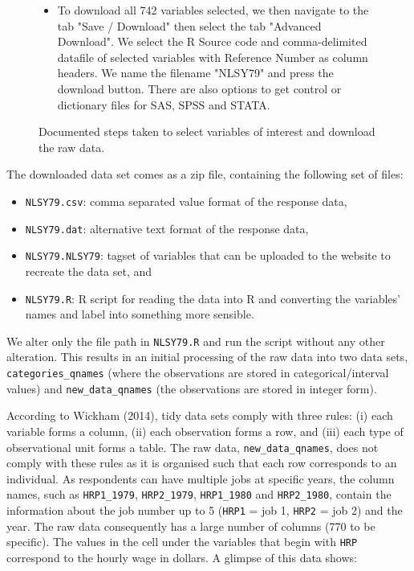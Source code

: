 \documentclass{article}
\begin{document}
\begin{figure}[t]
\begin{tcolorbox}[title = Navigating the data source]
\begin{itemize}
\begin{itemize}
\end{itemize}
\end{itemize}
\begin{itemize}
\item[\faCloudDownload] To download all 742 variables selected, we then navigate to the tab "Save / Download" then select the tab "Advanced Download". We select the R Source code and comma-delimited datafile of selected variables with Reference Number as column headers. We name the filename "NLSY79" and press the download button. There are also options to get control or dictionary files for SAS, SPSS and STATA. 
\end{itemize}
\end{tcolorbox}
\caption{Documented steps taken to select variables of interest and download the raw data.\label{fig:source-nav}}
\end{figure}

The downloaded data set comes as a zip file, containing the following set of files:

\begin{itemize}
\tightlist
\item
  \texttt{NLSY79.csv}: comma separated value format of the response data,
\item
  \texttt{NLSY79.dat}: alternative text format of the response data,
\item
  \texttt{NLSY79.NLSY79}: tagset of variables that can be uploaded to the website to recreate the data set, and
\item
  \texttt{NLSY79.R}: R script for reading the data into R and converting the variables' names and label into something more sensible.
\end{itemize}

We alter only the file path in \texttt{NLSY79.R} and run the script without any other alteration. This results in an initial processing of the raw data into two data sets, \texttt{categories\_qnames} (where the observations are stored in categorical/interval values) and \texttt{new\_data\_qnames} (the observations are stored in integer form).

According to Wickham (2014), tidy data sets comply with three rules: (i) each variable forms a column, (ii) each observation forms a row, and (iii) each type of observational unit forms a table. The raw data, \texttt{new\_data\_qnames}, does not comply with these rules as it is organised such that each row corresponds to an individual. As respondents can have multiple jobs at specific years, the column names, such as \texttt{HRP1\_1979}, \texttt{HRP2\_1979}, \texttt{HRP1\_1980} and \texttt{HRP2\_1980}, contain the information about the job number up to 5 (\texttt{HRP1} = job 1, \texttt{HRP2} = job 2) and the year. The raw data consequently has a large number of columns (770 to be specific). The values in the cell under the variables that begin with \texttt{HRP} correspond to the hourly wage in dollars. A glimpse of this data shows:
\end{document}
